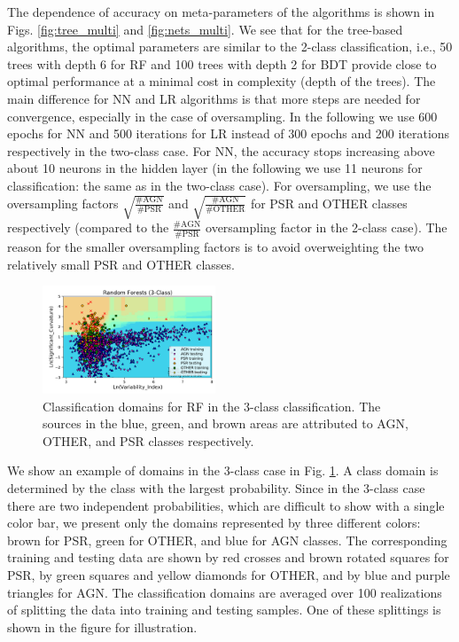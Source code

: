 The dependence of accuracy on meta-parameters of the algorithms is shown in Figs. \ref{fig:tree_multi} and \ref{fig:nets_multi}.
We see that for the tree-based algorithms, the optimal parameters are similar to the 2-class classification, i.e., 50 trees with depth 6 for RF and 100 trees with depth 2 for BDT 
provide close to optimal performance at a minimal cost in complexity (depth of the trees).
The main difference for NN and LR algorithms is that more steps are needed for convergence, especially in the case of oversampling. 
In the following we use 600 epochs for NN and 500 iterations for LR instead of 300 epochs and 200 iterations respectively in the two-class case.
For NN, the accuracy stops increasing above about 10 neurons in the hidden layer (in the following we use 11 neurons for classification: the same as in the two-class case).
For oversampling, we use the oversampling factors $\sqrt{\frac{\text{\# AGN}}{\text{\# PSR}}}$ and $\sqrt{\frac{\text{\# AGN}}{\text{\# OTHER}}}$ for PSR and OTHER classes respectively (compared to the $\frac{\text{\# AGN}}{\text{\# PSR}}$ oversampling factor in the 2-class case).
The reason for the smaller oversampling factors is to avoid overweighting the two relatively small PSR and OTHER classes.

\begin{figure}[h]
\centering
\includegraphics[width=0.46\textwidth]{plots/classification_domains/rf_50_6_3class.pdf}
\caption{Classification domains for RF in the 3-class classification.
The sources in the blue, green, and brown areas are attributed to AGN, OTHER, and PSR classes respectively.
}
\label{fig:RF_domains_3class}
\end{figure}

We show an example of domains in the 3-class case in Fig. \ref{fig:RF_domains_3class}.
A class domain is determined by the class with the largest probability.
Since in the 3-class case there are two independent probabilities, which are difficult to show with a single color bar,
we present only the domains represented by three different colors: brown for PSR, green for OTHER, and blue for AGN classes.
The corresponding training and testing data are shown by red crosses and brown rotated squares for PSR, by green squares and yellow diamonds for OTHER,
and by blue and purple triangles for AGN.
The classification domains are averaged over 100 realizations of splitting the data into training and testing samples.
One of these splittings is shown in the figure for illustration.


